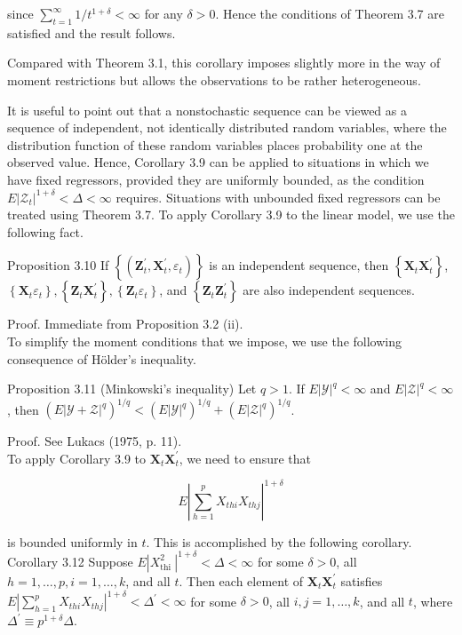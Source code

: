 \documentclass[10pt]{article}
\begin{document}
since $\sum_{t=1}^{\infty} 1 / t^{1+\delta}<\infty$ for any $\delta>0$. Hence the conditions of Theorem 3.7 are satisfied and the result follows.

Compared with Theorem 3.1, this corollary imposes slightly more in the way of moment restrictions but allows the observations to be rather heterogeneous.

It is useful to point out that a nonstochastic sequence can be viewed as a sequence of independent, not identically distributed random variables, where the distribution function of these random variables places probability one at the observed value. Hence, Corollary 3.9 can be applied to situations in which we have fixed regressors, provided they are uniformly bounded, as the condition $E\left|\mathcal{Z}_{t}\right|^{1+\delta}<\Delta<\infty$ requires. Situations with unbounded fixed regressors can be treated using Theorem 3.7. To apply Corollary 3.9 to the linear model, we use the following fact.

Proposition 3.10 If $\left\{\left(\mathbf{Z}_{t}^{\prime}, \mathbf{X}_{t}^{\prime}, \varepsilon_{t}\right)\right\}$ is an independent sequence, then $\left\{\mathbf{X}_{t} \mathbf{X}_{t}^{\prime}\right\}$, $\left\{\mathbf{X}_{t} \varepsilon_{t}\right\},\left\{\mathbf{Z}_{t} \mathbf{X}_{t}^{\prime}\right\},\left\{\mathbf{Z}_{t} \varepsilon_{t}\right\}$, and $\left\{\mathbf{Z}_{t} \mathbf{Z}_{t}^{\prime}\right\}$ are also independent sequences.

Proof. Immediate from Proposition 3.2 (ii).\\
To simplify the moment conditions that we impose, we use the following consequence of Hölder's inequality.

Proposition 3.11 (Minkowski's inequality) Let $q>1$. If $E|\mathcal{Y}|^{q}<\infty$ and $E|\mathcal{Z}|^{q}<\infty$, then $\left(E|\mathcal{Y}+\mathcal{Z}|^{q}\right)^{1 / q}<\left(E|\mathcal{Y}|^{q}\right)^{1 / q}+\left(E|\mathcal{Z}|^{q}\right)^{1 / q}$.

Proof. See Lukacs (1975, p. 11).\\
To apply Corollary 3.9 to $\mathbf{X}_{t} \mathbf{X}_{t}^{\prime}$, we need to ensure that

$$
E\left|\sum_{h=1}^{p} X_{t h i} X_{t h j}\right|^{1+\delta}
$$

is bounded uniformly in $t$. This is accomplished by the following corollary.\\
Corollary 3.12 Suppose $E\left|X_{\text {thi }}^{2}\right|^{1+\delta}<\Delta<\infty$ for some $\delta>0$, all $h= 1, \ldots, p, i=1, \ldots, k$, and all $t$. Then each element of $\mathbf{X}_{t} \mathbf{X}_{t}^{\prime}$ satisfies $E\left|\sum_{h=1}^{p} X_{t h i} X_{t h j}\right|^{1+\delta}<\Delta^{\prime}<\infty$ for some $\delta>0$, all $i, j=1, \ldots, k$, and all $t$, where $\Delta^{\prime} \equiv p^{1+\delta} \Delta$.
\end{document}
